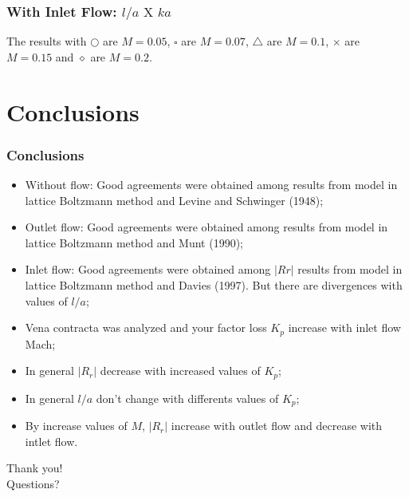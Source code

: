 \documentclass[dvipsnames,12pt]{beamer}
\begin{document}
\begin{frame}
\frametitle{With Inlet Flow: $l/a \text{ X } ka$}
\begin{figure}
  \centering

\end{figure}
\centering
The results with $\bigcirc$ are $M = 0.05$, $\square$ are $M = 0.07$, $\bigtriangleup$ are $M = 0.1$, $\times$ are $M = 0.15$ and $\diamond$ are $M = 0.2$.
\end{frame}

\section{Conclusions}
\begin{frame}
\frametitle{Conclusions}
\begin{itemize}
  \item Without flow: Good agreements were obtained among results from model in lattice Boltzmann method and Levine and Schwinger (1948);
  \item Outlet flow: Good agreements were obtained among results from model in lattice Boltzmann method and Munt (1990);
  \item Inlet flow: Good agreements were obtained among $|R{r}|$ results from model in lattice Boltzmann method and Davies (1997). But there are divergences with values of $l/a$;
  \item Vena contracta was analyzed and your factor loss $K_{p}$ increase with inlet flow Mach;
  \item In general $|R_{r}|$ decrease with increased values of $K_{p}$;
  \item In general $l/a$ don't change with differents values of $K_{p}$;
  \item By increase values of $M$, $|R_{r}|$ increase with outlet flow and decrease with intlet flow.
\end{itemize}
\end{frame}


\begin{frame}
\begin{center}
Thank you!\\[2cm]Questions?
\end{center}
\end{frame}
\end{document}
